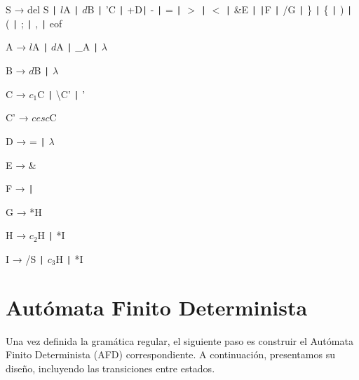 \documentclass{article}
\begin{document}
\begin{tcolorbox}[title=Gramática Regular]
    \hspace{0.5cm} S → del S \texttt{|} $l$A \texttt{|} $d$B \texttt{|} 'C \texttt{|} +D\texttt{|} - \texttt{|} = \texttt{|} \(>\) \texttt{|} \(<\) \texttt{|} \&E \texttt{|} \texttt{|}F \texttt{|} /G \texttt{|} \} \texttt{|} \{ \texttt{|} ) \texttt{|} ( \texttt{|} ; \texttt{|} , \texttt{|} eof
    
    \hspace{0.5cm} A → $l$A \texttt{|} $d$A \texttt{|} \_A \texttt{|} \( \lambda \)
    
    \hspace{0.5cm} B → $d$B \texttt{|} \( \lambda \)
    
    \hspace{0.5cm} C → $c_1$C \texttt{|} \textbackslash C' \texttt{|} '
    
    \hspace{0.5cm} C' → $cesc$C
    
    \hspace{0.5cm} D → = \texttt{|} \( \lambda \)
    
    \hspace{0.5cm} E → \&
    
    \hspace{0.5cm} F → \texttt{|}
    
    \hspace{0.5cm} G → *H
    
    \hspace{0.5cm} H → $c_2$H \texttt{|} *I
    
    \hspace{0.5cm} I → /S \texttt{|} $c_3$H \texttt{|} *I
\end{tcolorbox}

\section{Autómata Finito Determinista}
Una vez definida la gramática regular, el siguiente paso es construir el Autómata Finito Determinista (AFD) correspondiente. A continuación, presentamos su diseño, incluyendo las transiciones entre estados.

\vspace{0.1cm}


\end{document}

